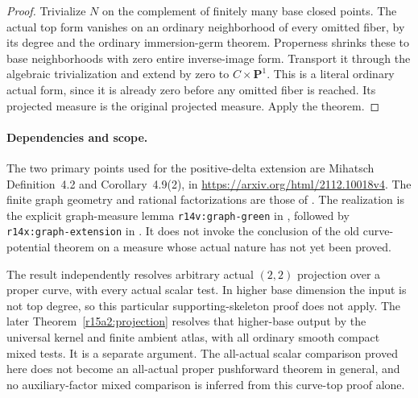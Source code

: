 \begin{proof}
Trivialize $N$ on the complement of finitely many base
closed points.  The actual top form vanishes on an ordinary
neighborhood of every omitted fiber, by its degree and the
ordinary immersion-germ theorem.  Properness shrinks these
to base neighborhoods with zero entire inverse-image form.
Transport it through the algebraic trivialization and
extend by zero to $C\times\mathbf P^1$.  This is a literal
ordinary actual form, since it is already zero before any
omitted fiber is reached.  Its projected measure is the
original projected measure.  Apply the theorem.
\end{proof}

\paragraph{Dependencies and scope.}
The two primary points used for the positive-delta extension
are Mihatsch Definition~4.2 and Corollary~4.9(2), in
\url{https://arxiv.org/html/2112.10018v4}.
The finite graph geometry and rational factorizations are
those of
.
The realization is the explicit graph-measure lemma
\texttt{r14v:graph-green} in
,
followed by \texttt{r14x:graph-extension} in
.
It does not invoke the conclusion of the old curve-potential
theorem on a measure whose actual nature has not yet been
proved.

The result independently resolves arbitrary actual $(2,2)$
projection over a proper curve, with every actual scalar test.
In higher base dimension the input is not top degree, so this
particular supporting-skeleton proof does not apply.  The later
Theorem~\ref{r15a2:projection} resolves that higher-base output
by the universal kernel and finite ambient atlas, with all
ordinary smooth compact mixed tests.  It is a separate argument.
The all-actual scalar comparison proved here does not become
an all-actual proper pushforward theorem in general, and no
auxiliary-factor mixed comparison is inferred from this
curve-top proof alone.

